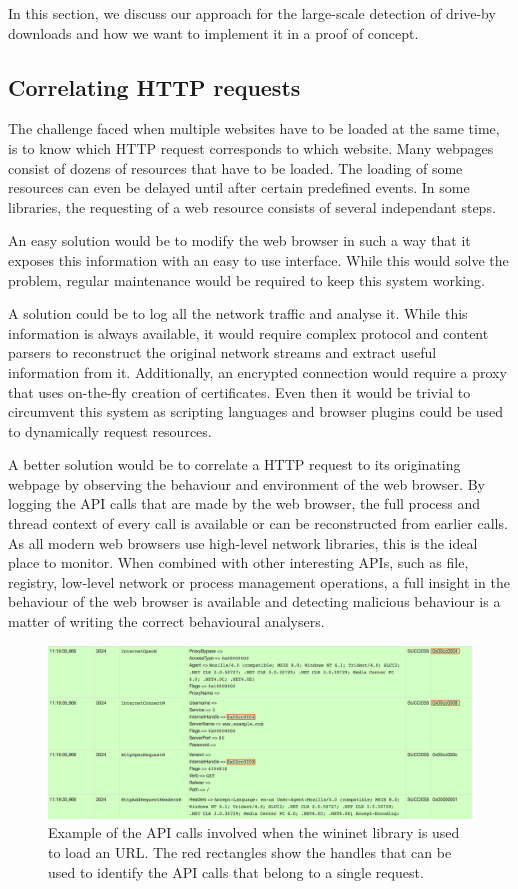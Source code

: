 In this section, we discuss our approach for the large-scale detection of drive-by downloads and how we want to implement it in a proof of concept.

\subsection{Correlating HTTP requests}

The challenge faced when multiple websites have to be loaded at the same time, is to know which HTTP request corresponds to which website. Many webpages consist of dozens of resources that have to be loaded. The loading of some resources can even be delayed until after certain predefined events. In some libraries, the requesting of a web resource consists of several independant steps.

An easy solution would be to modify the web browser in such a way that it exposes this information with an easy to use interface. While this would solve the problem, regular maintenance would be required to keep this system working. 

A solution could be to log all the network traffic and analyse it. While this information is always available, it would require complex protocol and content parsers to reconstruct the original network streams and extract useful information from it. Additionally, an encrypted connection would require a proxy that uses on-the-fly creation of certificates. Even then it would be trivial to circumvent this system as scripting languages and browser plugins could be used to dynamically request resources.

A better solution would be to correlate a HTTP request to its originating webpage by observing the behaviour and environment of the web browser. By logging the API calls that are made by the web browser, the full process and thread context of every call is available or can be reconstructed from earlier calls. As all modern web browsers use high-level network libraries, this is the ideal place to monitor. When combined with other interesting APIs, such as file, registry, low-level network or process management operations, a full insight in the behaviour of the web browser is available and detecting malicious behaviour is a matter of writing the correct behavioural analysers.

\begin{figure}
    \centering
    \includegraphics[width=14.7cm]{Images/wininet.png}
    \caption{Example of the API calls involved when the wininet library is used to load an URL. The red rectangles show the handles that can be used to identify the API calls that belong to a single request.}
    \label{fig:wininet}
\end{figure}

